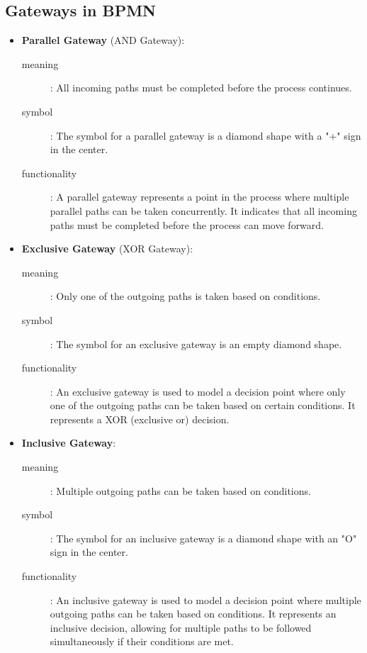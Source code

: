 \subsection{Gateways in BPMN}

\begin{itemize}
   \item \textbf{Parallel Gateway} (AND Gateway):
         \begin{description}
            \item[meaning]: All incoming paths must be completed before the process continues.
            \item[symbol]: The symbol for a parallel gateway is a diamond shape with a "+" sign in the center.
            \item[functionality]: A parallel gateway represents a point in the process where multiple parallel paths can be taken concurrently. It indicates that all incoming paths must be completed before the process can move forward.
         \end{description}
\end{itemize}
\begin{itemize}
   \item \textbf{Exclusive Gateway} (XOR Gateway):
         \begin{description}
            \item[meaning]: Only one of the outgoing paths is taken based on conditions.
            \item[symbol]: The symbol for an exclusive gateway is an empty diamond shape.
            \item[functionality]: An exclusive gateway is used to model a decision point where only one of the outgoing paths can be taken based on certain conditions. It represents a XOR (exclusive or) decision.
         \end{description}
\end{itemize}
\begin{itemize}
   \item \textbf{Inclusive Gateway}:
         \begin{description}
            \item[meaning]: Multiple outgoing paths can be taken based on conditions.
            \item[symbol]: The symbol for an inclusive gateway is a diamond shape with an "O" sign in the center.
            \item[functionality]: An inclusive gateway is used to model a decision point where multiple outgoing paths can be taken based on conditions. It represents an inclusive decision, allowing for multiple paths to be followed simultaneously if their conditions are met.
         \end{description}
\end{itemize}

